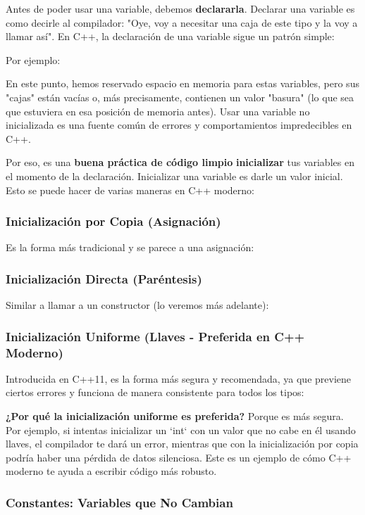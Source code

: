 Antes de poder usar una variable, debemos \textbf{declararla}. Declarar una variable es como decirle al compilador: "Oye, voy a necesitar una caja de este tipo y la voy a llamar así". En C++, la declaración de una variable sigue un patrón simple:

Por ejemplo:


En este punto, hemos reservado espacio en memoria para estas variables, pero sus "cajas" están vacías o, más precisamente, contienen un valor "basura" (lo que sea que estuviera en esa posición de memoria antes). Usar una variable no inicializada es una fuente común de errores y comportamientos impredecibles en C++.

Por eso, es una \textbf{buena práctica de código limpio} \textbf{inicializar} tus variables en el momento de la declaración. Inicializar una variable es darle un valor inicial. Esto se puede hacer de varias maneras en C++ moderno:

\subsubsection{Inicialización por Copia (Asignación)}
Es la forma más tradicional y se parece a una asignación:

\subsubsection{Inicialización Directa (Paréntesis)}
Similar a llamar a un constructor (lo veremos más adelante):

\subsubsection{Inicialización Uniforme (Llaves - Preferida en C++ Moderno)}
Introducida en C++11, es la forma más segura y recomendada, ya que previene ciertos errores y funciona de manera consistente para todos los tipos:

\textbf{¿Por qué la inicialización uniforme es preferida?}
Porque es más segura. Por ejemplo, si intentas inicializar un `int` con un valor que no cabe en él usando llaves, el compilador te dará un error, mientras que con la inicialización por copia podría haber una pérdida de datos silenciosa. Este es un ejemplo de cómo C++ moderno te ayuda a escribir código más robusto.

\subsubsection{Constantes: Variables que No Cambian}

